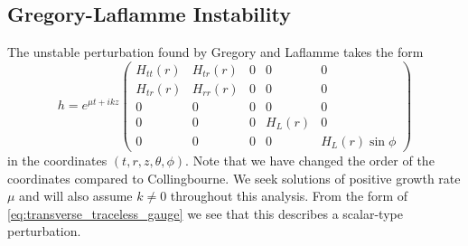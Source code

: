 \documentclass[11pt,aip,jmp,amsmath,amssymb,draft]{revtex4-1}
\begin{document}
\subsection{Gregory-Laflamme Instability}
The unstable perturbation found by Gregory and Laflamme \cite{gregory1993black} takes the form
\begin{equation} \label{eq:transverse_traceless_gauge}
    h = e^{\mu t + ikz} \begin{pmatrix} H_{tt}(r)& H_{tr}(r) & 0 & 0 & 0\\ H_{tr}(r) & H_{rr}(r) & 0 & 0 & 0\\ 0 & 0 & 0 & 0& 0\\ 0 & 0 & 0 & H_L(r) & 0 \\ 0  & 0 & 0  & 0 & H_L(r)\sin\phi \end{pmatrix}
\end{equation}
in the coordinates $(t,r,z,\theta,\phi)$. Note that we have changed the order of the coordinates compared to Collingbourne.
We seek solutions of positive growth rate $\mu$ and will also assume $k \ne 0$ throughout this analysis.
From the form of \cref{eq:transverse_traceless_gauge} we see that this describes a scalar-type perturbation.
\end{document}

